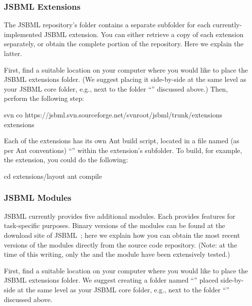 \subsubsection{JSBML Extensions}

The JSBML repository's  folder contains a separate
subfolder for each currently-implemented JSBML extension. You can either
retrieve a copy of each extension separately, or obtain the complete
 portion of the repository.  Here we explain the latter.

First, find a suitable location on your computer where you would like to
place the JSBML extensions folder.  (We suggest placing it side-by-side at
the same level as your JSBML core folder, e.g., next to the folder
``\dirname'' discussed above.)  Then, perform the following step:

\begin{example}[style=bash, title={Downloading the latest JSBML extensions
    source folder from the project's Subversion repository.}] 
svn co https://jsbml.svn.sourceforge.net/svnroot/jsbml/trunk/extensions extensions
\end{example}

Each of the extensions has its own Ant build script, located in a file
named (as per Ant conventions) ``'' within the extension's
subfolder.  To build, for example, the  extension, you could
do the following:

\begin{example}[style=bash, title={Compiling the ``\code{layout}'' extension.}]
cd extensions/layout
ant compile
\end{example}


\subsubsection{JSBML Modules}
\label{sec:jsbml-modules}

JSBML currently provides five additional modules.  Each provides features
for task-specific purposes. Binary versions of the modules can be found at
the download site of JSBML~\cite{JSBMLdownload}; here we explain how you
can obtain the most recent versions of the modules directly from the source
code repository.  (Note: at the time of this writing, only the
 and the  module have been extensively
tested.)

First, find a suitable location on your computer where you would like to
place the JSBML extensions folder.  We suggest creating a folder named
``'' placed side-by-side at the same level as your JSBML core
folder, e.g., next to the folder ``\dirname'' discussed above.

